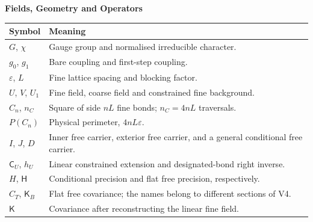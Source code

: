 \documentclass[11pt,a4paper]{article}
\newcommand{\subhead}[1]{\par\vspace{4pt}\textbf{\color{ink}#1}\par}
\begin{document}
\subhead{Fields, Geometry and Operators}
\begin{small}
    \begin{tabularx}{\textwidth}{@{}p{}X@{}}
        \toprule
        \textbf{Symbol} & \textbf{Meaning}\\
        \midrule
        $G$, $\chi$ & Gauge group and normalised irreducible character.\\[3pt]
        $g_0$, $g_1$ & Bare coupling and first-step coupling.\\[3pt]
        $\varepsilon$, $L$ & Fine lattice spacing and blocking factor.\\[3pt]
        $U$, $V$, $U_1$ & Fine field, coarse field and constrained fine background.\\[3pt]
        $C_n$, $n_C$ & Square of side $nL$ fine bonds; $n_C=4nL$ traversals.\\[3pt]
        $P(C_n)$ & Physical perimeter, $4nL\varepsilon$.\\[3pt]
        $I$, $J$, $D$ & Inner free carrier, exterior free carrier, and a general conditional free carrier.\\[3pt]
        $\mathsf C_U$, $h_U$ & Linear constrained extension and designated-bond right inverse.\\[3pt]
        $H$, $\mathsf H$ & Conditional precision and flat free precision, respectively.\\[3pt]
        $C_T$, $\mathsf K_B$ & Flat free covariance; the names belong to different sections of V4.\\[3pt]
        $\mathsf K$ & Covariance after reconstructing the linear fine field.\\
        \bottomrule
    \end{tabularx}
\end{small}
\end{document}
